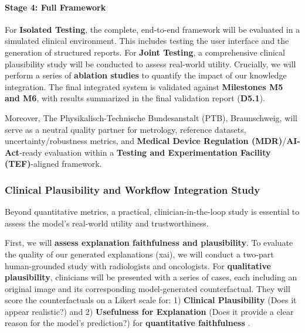 \documentclass[11pt, a4paper]{article}
\begin{document}
\paragraph{Stage 4: Full Framework}
For \textbf{Isolated Testing}, the complete, end-to-end framework will be evaluated in a simulated clinical environment. This includes testing the user interface and the generation of structured reports. For \textbf{Joint Testing}, a comprehensive clinical plausibility study will be conducted to assess real-world utility. Crucially, we will perform a series of \textbf{ablation studies} to quantify the impact of our knowledge integration. The final integrated system is validated against \textbf{Milestones M5 and M6}, with results summarized in the final validation report (\textbf{D5.1}).

Moreover, The Physikalisch-Technische Bundesanstalt (PTB), Braunschweig, will serve as a neutral quality partner for metrology, reference datasets, uncertainty/robustness metrics, and \textbf{Medical Device Regulation (MDR)}/\textbf{AI-Act}-ready evaluation within a \textbf{Testing and Experimentation Facility (TEF)}-aligned framework.



\subsubsection{Clinical Plausibility and Workflow Integration Study}
Beyond quantitative metrics, a practical, clinician-in-the-loop study is essential to assess the model's real-world utility and trustworthiness.

First, we will \textbf{assess explanation faithfulness and plausibility}. To evaluate the quality of our generated explanations (\gls{xai}), we will conduct a two-part human-grounded study with radiologists and oncologists. For \textbf{qualitative plausibility}, clinicians will be presented with a series of cases, each including an original image and its corresponding model-generated counterfactual. They will score the counterfactuals on a Likert scale for: 1) \textbf{Clinical Plausibility} (Does it appear realistic?) and 2) \textbf{Usefulness for Explanation} (Does it provide a clear reason for the model's prediction?) for \textbf{quantitative faithfulness} .
\end{document}
